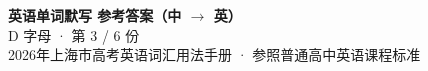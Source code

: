 \documentclass[10pt,a4paper]{article}
\begin{document}
\pagestyle{plain}

\begin{center}
{\LARGE\bfseries 英语单词默写 \quad 参考答案（中 $\to$ 英）}\\[0.22em]
{\large D 字母 · 第 3 / 6 份}\\[0.18em]
{\small 2026年上海市高考英语词汇用法手册 · 参照普通高中英语课程标准}
\end{center}

\vspace{0.2em}
\noindent{\color{rulegray}\rule{\textwidth}{0.8pt}}

\vspace{0.35em}

\vspace{0.25em}
\renewcommand{\arraystretch}{1.32}
\end{document}
